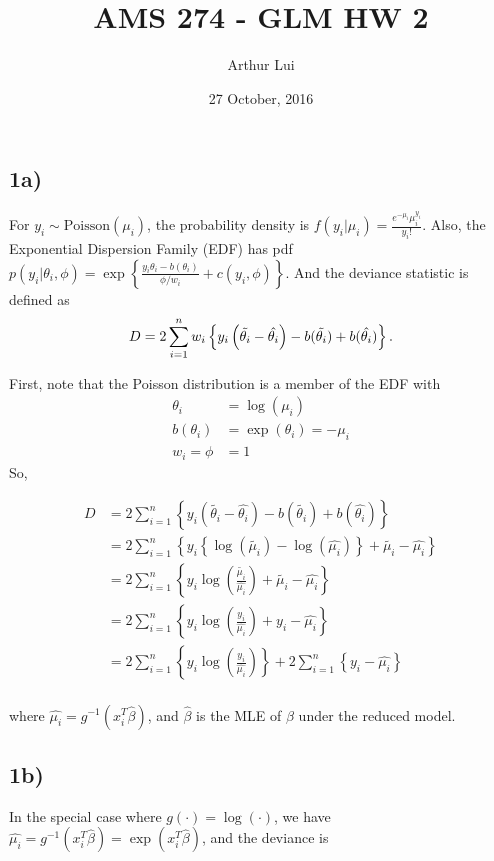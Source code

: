 \documentclass[12pt,]{article}
\title{AMS 274 - GLM HW 2}
\author{Arthur Lui}
\date{27 October, 2016}
\newcommand{\p}[1]{\left(#1\right)}
\newcommand{\bc}[1]{ \left\{#1\right\} }
\newcommand{\suml}{ \sum_{i=1}^n }
\newcommand{\ds}{ \displaystyle }
\newcommand{\Poisson}{\text{Poisson}}
\begin{document}
\maketitle

\allowdisplaybreaks

\subsection{1a)}\label{a}

For \(y_i \sim \Poisson(\mu_i)\), the probability density is
\(f(y_i|\mu_i) = \ds\frac{e^{-\mu_i}\mu_i^{y_i}}{y_i!}\). Also, the
Exponential Dispersion Family (EDF) has pdf
\(p(y_i|\theta_i,\phi) = \exp\bc{\ds\frac{y_i\theta_i - b(\theta_i)}{\phi/w_i} + c(y_i,\phi)}\).
And the deviance statistic is defined as \[
D = 2\suml w_i \bc{y_i\p{\tilde{\theta_i}-\hat{\theta_i}} - b(\tilde{\theta_i}) + b(\hat{\theta_i})}.\\
\]

First, note that the Poisson distribution is a member of the EDF with \[
\begin{split}
\theta_i &= \log(\mu_i)\\
b(\theta_i) &= \exp(\theta_i) = -\mu_i\\
w_i = \phi &= 1
\end{split}
\] So,

\begin{align*}
D &= 2\suml \bc{y_i\p{\tilde{\theta_i}-\hat{\theta_i}} - b(\tilde{\theta_i}) + b(\hat{\theta_i})} \\
  &= 2\suml \bc{y_i\bc{\log(\tilde{\mu_i})-\log(\hat{\mu_i})} + \tilde{\mu_i} - \hat{\mu_i}} \\
  &= 2\suml \bc{y_i\log\p{\frac{\tilde{\mu_i}}{\hat{\mu_i}}} + \tilde{\mu_i} - \hat{\mu_i}} \\
  &= 2\suml \bc{y_i\log\p{\frac{y_i}{\hat{\mu_i}}} + y_i - \hat{\mu_i}} \\
  &= 2\suml \bc{y_i\log\p{\frac{y_i}{\hat{\mu_i}}}} + 2\suml\bc{y_i - \hat{\mu_i}}\\
\end{align*}

where \(\hat{\mu_i} = g^{-1}(x_i^T\hat\beta)\), and \(\hat\beta\) is the
MLE of \(\beta\) under the reduced model.

\subsection{1b)}\label{b}

In the special case where \(g(\cdot) = \log(\cdot)\), we have
\(\hat{\mu_i} = g^{-1}(x_i^T\hat\beta) = \exp(x_i^T\hat\beta)\), and the
deviance is
\end{document}
